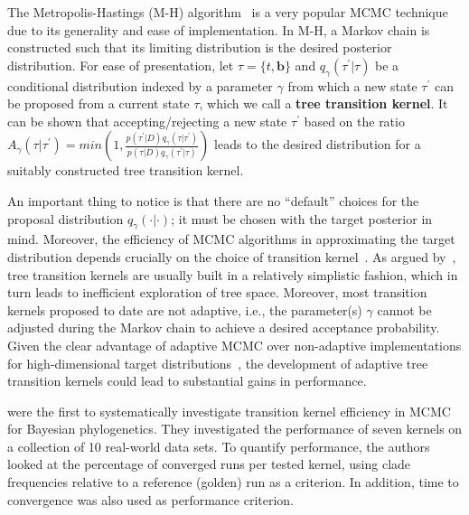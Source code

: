 The Metropolis-Hastings (M-H) algorithm~\citep{Metropolis1953, Hastings1970} is a very popular MCMC technique due to its generality and ease of implementation.
In M-H, a Markov chain is constructed such that its limiting distribution is the desired posterior distribution. 
For ease of presentation, let $\tau = \{ t, \boldsymbol b\}$ and $q_{\gamma}(\tau^\prime|\tau)$ be a conditional distribution indexed by a parameter $\gamma$ from which a new state $\tau^\prime$ can be proposed from a current state $\tau$, which we call a \textbf{tree transition kernel}. 
It can be shown that accepting/rejecting a new state $\tau^\prime$ based on the ratio $A_{\gamma}(\tau | \tau^\prime) = min\left(1, \frac{p(\tau^\prime | D)q_{\gamma}(\tau|\tau^\prime)}{p(\tau | D)q_{\gamma}(\tau^\prime|\tau)}\right)$ leads to the desired distribution for a suitably constructed tree transition kernel.

An important thing to notice is that there are no ``default'' choices for the proposal distribution $q_{\gamma}(\cdot|\cdot)$; it must be chosen with the target posterior in mind.
Moreover, the efficiency of MCMC algorithms in approximating the target distribution depends crucially on the choice of transition kernel~\citep{Brooks2003,AlAwadhi2004,Yang2013}.
As argued by~\cite{Hoehna2012}, tree transition kernels are usually built in a relatively simplistic fashion, which in turn leads to inefficient exploration of tree space.
Moreover, most transition kernels proposed to date are not adaptive, i.e., the parameter(s) $\gamma$ cannot be adjusted during the Markov chain to achieve a desired acceptance probability.
Given the clear advantage of adaptive MCMC over non-adaptive implementations for high-dimensional target distributions~\citep{Roberts2009, Baele2017}, the development of adaptive tree transition kernels could lead to substantial gains in performance.

\cite{Lakner2008} were the first to systematically investigate transition kernel efficiency in MCMC for Bayesian phylogenetics.
They investigated the performance of seven kernels on a collection of 10 real-world data sets.
To quantify performance, the authors looked at the percentage of converged runs per tested kernel, using clade frequencies relative to a reference (golden) run as a criterion.
In addition, time to convergence was also used as performance criterion.

